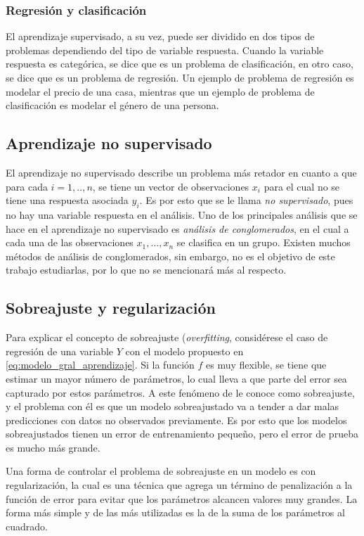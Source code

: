 \subsubsection{Regresión y clasificación}

El aprendizaje supervisado, a su vez, puede ser dividido en dos tipos de problemas dependiendo del tipo de variable respuesta. Cuando la variable respuesta es categórica, se dice que es un problema de clasificación, en otro caso, se dice que es un problema de regresión. Un ejemplo de problema de regresión es modelar el precio de una casa, mientras que un ejemplo de problema de clasificación es modelar el género de una persona. 

\subsection{Aprendizaje no supervisado}

El aprendizaje no supervisado describe un problema más retador en cuanto a que para cada $i = 1, .., n$, se tiene un vector de observaciones $x_i$ para el cual no se tiene una respuesta asociada $y_i$. Es por esto que se le llama \textit{no supervisado}, pues no hay una variable respuesta en el análisis. Uno de los principales análisis que se hace en el aprendizaje no supervisado es \textit{análisis de conglomerados}, en el cual a cada una de las observaciones $x_1, ..., x_n$ se clasifica en un grupo. Existen muchos métodos de análisis de conglomerados, sin embargo, no es el objetivo de este trabajo estudiarlas, por lo que no se mencionará más al respecto.


\subsection{Sobreajuste y regularización}

Para explicar el concepto de sobreajuste (\textit{overfitting}, considérese el caso de regresión de una variable $Y$ con el modelo propuesto en \ref{eq:modelo_gral_aprendizaje}. Si la función $f$ es muy flexible, se tiene que estimar un mayor número de parámetros, lo cual lleva a que parte del error sea capturado por estos parámetros. A este fenómeno de le conoce como sobreajuste, y el problema con él es que un modelo sobreajustado va a tender a dar malas predicciones con datos no observados previamente. Es por esto que los modelos sobreajustados tienen un error de entrenamiento pequeño, pero el error de prueba es mucho más grande.

Una forma de controlar el problema de sobreajuste en un modelo es con regularización, la cual es una técnica que agrega un término de penalización a la función de error para evitar que los parámetros alcancen valores muy grandes. La forma más simple y de las más utilizadas es la de la suma de los parámetros al cuadrado. 

